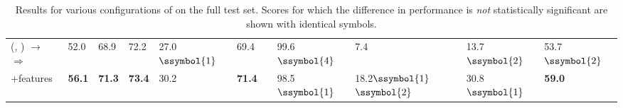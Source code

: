 \begin{table*}[t!]
\begin{tabular}{l@{\hskip 3mm}llllll@{\hskip 1mm}llll}
\hspace{0.2cm}(\Comment{}, \EditCode{}) $\rightarrow$ \EditComment{}  $\Rightarrow$ \NewComment{}  & 52.0 & 68.9 & 72.2 &  27.0$\ssymbol{1}$ & 69.4&  & 99.6$\ssymbol{4}$ & 7.4 & 13.7$\ssymbol{2}$ & 53.7$\ssymbol{2}$ \\
\hspace{0.6cm}+features & \bf 56.1 & \bf 71.3 & \bf 73.4 & 30.2 & \bf 71.4&  & 98.5$\ssymbol{1}$ & 18.2$\ssymbol{1}$$\ssymbol{2}$ & 30.8$\ssymbol{1}$ & \bf 59.0 \\



\hline
\end{tabular}
\vspace{-5pt}
\caption{\label{table:full-update-configs}Results for various configurations of \UpdateCopy{} on the full test set. Scores for which the difference in performance is \textit{not} statistically significant are shown with identical symbols.}
\vspace{-8pt}
\end{table*}
																									